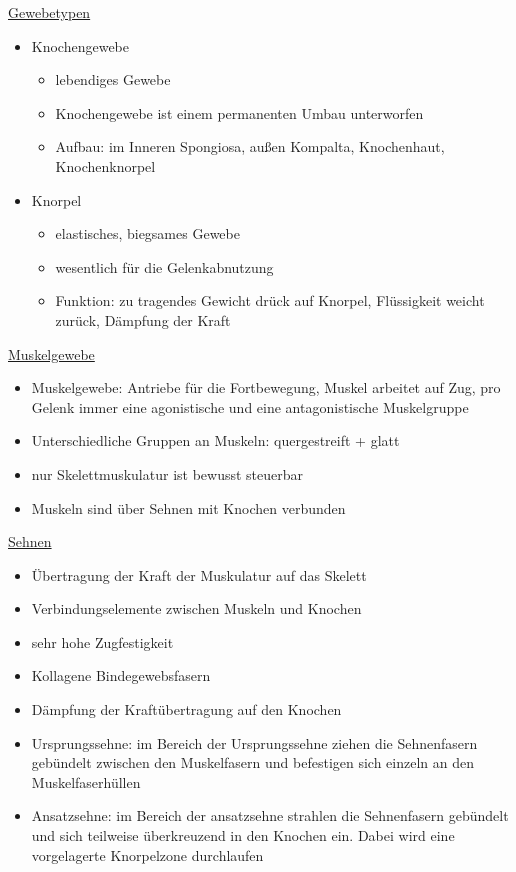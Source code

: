 \documentclass[a4paper,10pt,oneside]{article}
\begin{document}
 
\underline{Gewebetypen} \\
 	\begin{itemize}
 		\item Knochengewebe
 			\begin{itemize}
 				\item lebendiges Gewebe
 				\item Knochengewebe ist einem permanenten Umbau unterworfen
 				\item Aufbau: im Inneren Spongiosa, außen Kompalta, Knochenhaut, Knochenknorpel
 			\end{itemize}
 		\item Knorpel
 			\begin{itemize}
 				\item elastisches, biegsames Gewebe
 				\item wesentlich für die Gelenkabnutzung
 				\item Funktion: zu tragendes Gewicht drück auf Knorpel, Flüssigkeit weicht zurück, Dämpfung der Kraft
 			\end{itemize}
 	\end{itemize}
 	
 
\underline{Muskelgewebe} \\
	\begin{itemize}
		\item Muskelgewebe: Antriebe für die Fortbewegung, Muskel arbeitet auf Zug, pro Gelenk immer eine agonistische und eine antagonistische Muskelgruppe
		\item Unterschiedliche Gruppen an Muskeln: quergestreift + glatt
		\item nur Skelettmuskulatur ist bewusst steuerbar
		\item Muskeln sind über Sehnen mit Knochen verbunden
	\end{itemize}
	

\underline{Sehnen} \\
	\begin{itemize}
		\item Übertragung der Kraft der Muskulatur auf das Skelett
		\item Verbindungselemente zwischen Muskeln und Knochen
		\item sehr hohe Zugfestigkeit
		\item Kollagene Bindegewebsfasern
		\item Dämpfung der Kraftübertragung auf den Knochen
		\item Ursprungssehne: im Bereich der Ursprungssehne ziehen die Sehnenfasern gebündelt zwischen den Muskelfasern und befestigen sich einzeln an den Muskelfaserhüllen
		\item Ansatzsehne: im Bereich der ansatzsehne strahlen die Sehnenfasern gebündelt und sich teilweise überkreuzend in den Knochen ein. Dabei wird eine vorgelagerte Knorpelzone durchlaufen
	\end{itemize}
	
\end{document}
